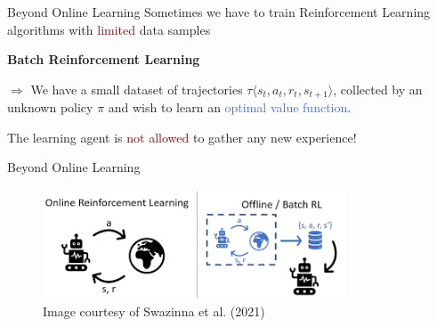 \documentclass{beamer}
\begin{document}
\begin{frame}{Beyond Online Learning}
	Sometimes we have to train Reinforcement Learning algorithms with \textcolor{Maroon}{limited} data samples
	\bigskip
	
	\begin{center}
		\textcolor{skymagenta}{\textbf{Batch Reinforcement Learning}}
	\end{center}

	\bigskip

	$\Rightarrow$ We have a small dataset of trajectories $\tau \langle s_t, a_t, r_t, s_{t+1}\rangle$, collected by an unknown policy $\pi$ and wish
	to learn an \textcolor{RoyalBlue}{optimal value function}.

	\bigskip 

	The learning agent is \textcolor{Maroon}{not allowed} to gather any new experience!
\end{frame}


\begin{frame}{Beyond Online Learning}
	\begin{center}
		\begin{figure}
			\includegraphics[width=9cm]{./Images/batch}
			\caption{Image courtesy of Swazinna et al. (2021)}
		\end{figure}
	\end{center}
\end{frame}
\end{document}
